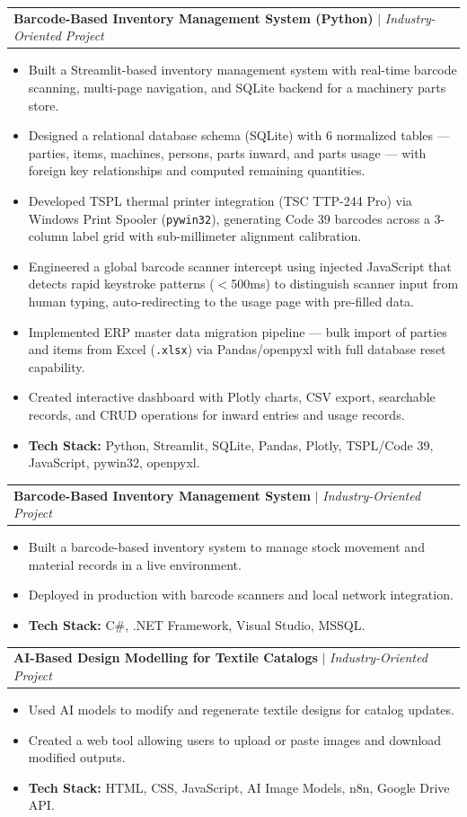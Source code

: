 \documentclass[letterpaper,11pt]{article}
\makeatletter
\newcommand{\resumeItem}[1]{
  \item\small{
    {#1 \vspace{-2pt}}
  }
}
\newcommand{\resumeProjectHeading}[2]{
    \item
    \begin{tabular*}{0.97\textwidth}{l@{\extracolsep{\fill}}r}
      \small#1 & #2 \\
    \end{tabular*}\vspace{-7pt}
}
\newcommand{\resumeItemListStart}{\begin{itemize}}
\newcommand{\resumeItemListEnd}{\end{itemize}\vspace{-5pt}}
\makeatother
\begin{document}
      \resumeProjectHeading
          {\textbf{Barcode-Based Inventory Management System (Python)} $|$ \emph{Industry-Oriented Project}}{}
          \resumeItemListStart
            \resumeItem{Built a Streamlit-based inventory management system with real-time barcode scanning, multi-page navigation, and SQLite backend for a machinery parts store.}
            \resumeItem{Designed a relational database schema (SQLite) with 6 normalized tables --- parties, items, machines, persons, parts inward, and parts usage --- with foreign key relationships and computed remaining quantities.}
            \resumeItem{Developed TSPL thermal printer integration (TSC TTP-244 Pro) via Windows Print Spooler (\texttt{pywin32}), generating Code 39 barcodes across a 3-column label grid with sub-millimeter alignment calibration.}
            \resumeItem{Engineered a global barcode scanner intercept using injected JavaScript that detects rapid keystroke patterns ($<$500ms) to distinguish scanner input from human typing, auto-redirecting to the usage page with pre-filled data.}
            \resumeItem{Implemented ERP master data migration pipeline --- bulk import of parties and items from Excel (\texttt{.xlsx}) via Pandas/openpyxl with full database reset capability.}
            \resumeItem{Created interactive dashboard with Plotly charts, CSV export, searchable records, and CRUD operations for inward entries and usage records.}
            \resumeItem{\textbf{Tech Stack:} Python, Streamlit, SQLite, Pandas, Plotly, TSPL/Code 39, JavaScript, pywin32, openpyxl.}
          \resumeItemListEnd

      \resumeProjectHeading
          {\textbf{Barcode-Based Inventory Management System} $|$ \emph{Industry-Oriented Project}}{}
          \resumeItemListStart
            \resumeItem{Built a barcode-based inventory system to manage stock movement and material records in a live environment.}
            \resumeItem{Deployed in production with barcode scanners and local network integration.}
            \resumeItem{\textbf{Tech Stack:} C\#, .NET Framework, Visual Studio, MSSQL.}
          \resumeItemListEnd

      \resumeProjectHeading
          {\textbf{AI-Based Design Modelling for Textile Catalogs} $|$ \emph{Industry-Oriented Project}}{}
          \resumeItemListStart
            \resumeItem{Used AI models to modify and regenerate textile designs for catalog updates.}
            \resumeItem{Created a web tool allowing users to upload or paste images and download modified outputs.}
            \resumeItem{\textbf{Tech Stack:} HTML, CSS, JavaScript, AI Image Models, n8n, Google Drive API.}
          \resumeItemListEnd
\end{document}

